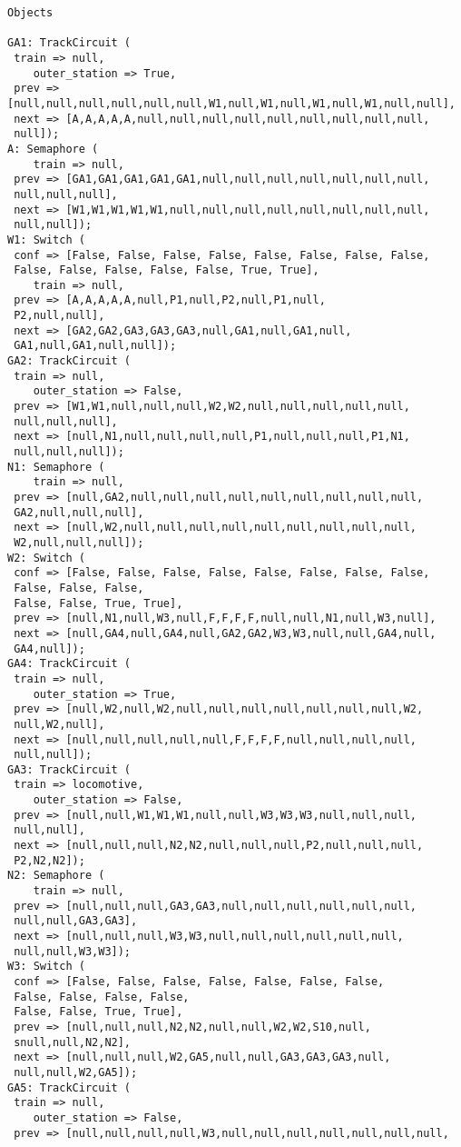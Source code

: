 \begin{lstlisting}[caption={oggetti istanziati nella simulazione}]
Objects

GA1: TrackCircuit (
 train => null, 
    outer_station => True,
 prev => [null,null,null,null,null,null,W1,null,W1,null,W1,null,W1,null,null],
 next => [A,A,A,A,A,null,null,null,null,null,null,null,null,null,
 null]);
A: Semaphore (
    train => null,
 prev => [GA1,GA1,GA1,GA1,GA1,null,null,null,null,null,null,null,
 null,null,null],
 next => [W1,W1,W1,W1,W1,null,null,null,null,null,null,null,null,
 null,null]);
W1: Switch (
 conf => [False, False, False, False, False, False, False, False, 
 False, False, False, False, False, True, True],
    train => null,
 prev => [A,A,A,A,A,null,P1,null,P2,null,P1,null,
 P2,null,null],
 next => [GA2,GA2,GA3,GA3,GA3,null,GA1,null,GA1,null,
 GA1,null,GA1,null,null]);
GA2: TrackCircuit (
 train => null, 
    outer_station => False,
 prev => [W1,W1,null,null,null,W2,W2,null,null,null,null,null,
 null,null,null],
 next => [null,N1,null,null,null,null,P1,null,null,null,P1,N1,
 null,null,null]);
N1: Semaphore (
    train => null,
 prev => [null,GA2,null,null,null,null,null,null,null,null,null,
 GA2,null,null,null],
 next => [null,W2,null,null,null,null,null,null,null,null,null,
 W2,null,null,null]);
W2: Switch (
 conf => [False, False, False, False, False, False, False, False, 
 False, False, False, 
 False, False, True, True],
 prev => [null,N1,null,W3,null,F,F,F,F,null,null,N1,null,W3,null],
 next => [null,GA4,null,GA4,null,GA2,GA2,W3,W3,null,null,GA4,null,
 GA4,null]);
GA4: TrackCircuit (
 train => null, 
    outer_station => True,
 prev => [null,W2,null,W2,null,null,null,null,null,null,null,W2,
 null,W2,null],
 next => [null,null,null,null,null,F,F,F,F,null,null,null,null,
 null,null]);
GA3: TrackCircuit (
 train => locomotive, 
    outer_station => False,
 prev => [null,null,W1,W1,W1,null,null,W3,W3,W3,null,null,null,
 null,null],
 next => [null,null,null,N2,N2,null,null,null,P2,null,null,null,
 P2,N2,N2]);
N2: Semaphore (
    train => null,
 prev => [null,null,null,GA3,GA3,null,null,null,null,null,null,
 null,null,GA3,GA3],
 next => [null,null,null,W3,W3,null,null,null,null,null,null,
 null,null,W3,W3]);
W3: Switch (
 conf => [False, False, False, False, False, False, False, 
 False, False, False, False, 
 False, False, True, True],
 prev => [null,null,null,N2,N2,null,null,W2,W2,S10,null,
 snull,null,N2,N2],
 next => [null,null,null,W2,GA5,null,null,GA3,GA3,GA3,null,
 null,null,W2,GA5]);
GA5: TrackCircuit (
 train => null, 
    outer_station => False,
 prev => [null,null,null,null,W3,null,null,null,null,null,null,null,

\end{lstlisting}
